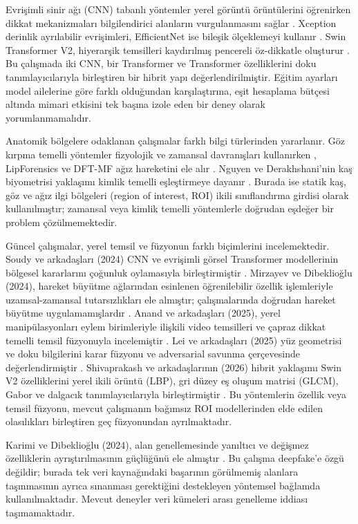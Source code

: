 \documentclass[a4paper]{elektr}
\begin{document}
Evrişimli sinir ağı (CNN) tabanlı yöntemler yerel görüntü örüntülerini öğrenirken dikkat mekanizmaları bilgilendirici alanların vurgulanmasını sağlar \cite{zhao}. Xception derinlik ayrılabilir evrişimleri, EfficientNet ise bileşik ölçeklemeyi kullanır \cite{chollet,tan}. Swin Transformer V2, hiyerarşik temsilleri kaydırılmış pencereli öz-dikkatle oluşturur \cite{swin}. Bu çalışmada iki CNN, bir Transformer ve Transformer özelliklerini doku tanımlayıcılarıyla birleştiren bir hibrit yapı değerlendirilmiştir. Eğitim ayarları model ailelerine göre farklı olduğundan karşılaştırma, eşit hesaplama bütçesi altında mimari etkisini tek başına izole eden bir deney olarak yorumlanmamalıdır.

Anatomik bölgelere odaklanan çalışmalar farklı bilgi türlerinden yararlanır. Göz kırpma temelli yöntemler fizyolojik ve zamansal davranışları kullanırken \cite{li,jung}, LipForensics ve DFT-MF ağız hareketini ele alır \cite{haliassos,elhassan}. Nguyen ve Derakhshani'nin kaş biyometrisi yaklaşımı kimlik temelli eşleştirmeye dayanır \cite{nguyen}. Burada ise statik kaş, göz ve ağız ilgi bölgeleri (region of interest, ROI) ikili sınıflandırma girdisi olarak kullanılmıştır; zamansal veya kimlik temelli yöntemlerle doğrudan eşdeğer bir problem çözülmemektedir.

Güncel çalışmalar, yerel temsil ve füzyonun farklı biçimlerini incelemektedir. Soudy ve arkadaşları (2024) CNN ve evrişimli görsel Transformer modellerinin bölgesel kararlarını çoğunluk oylamasıyla birleştirmiştir \cite{soudy}. Mirzayev ve Dibeklioğlu (2024), hareket büyütme ağlarından esinlenen öğrenilebilir özellik işlemleriyle uzamsal-zamansal tutarsızlıkları ele almıştır; çalışmalarında doğrudan hareket büyütme uygulamamışlardır \cite{mirzayev}. Anand ve arkadaşları (2025), yerel manipülasyonları eylem birimleriyle ilişkili video temsilleri ve çapraz dikkat temelli temsil füzyonuyla incelemiştir \cite{anand}. Lei ve arkadaşları (2025) yüz geometrisi ve doku bilgilerini karar füzyonu ve adversarial savunma çerçevesinde değerlendirmiştir \cite{lei}. Shivaprakash ve arkadaşlarının (2026) hibrit yaklaşımı Swin V2 özelliklerini yerel ikili örüntü (LBP), gri düzey eş oluşum matrisi (GLCM), Gabor ve dalgacık tanımlayıcılarıyla birleştirmiştir \cite{shivaprakash}. Bu yöntemlerin özellik veya temsil füzyonu, mevcut çalışmanın bağımsız ROI modellerinden elde edilen olasılıkları birleştiren geç füzyonundan ayrılmaktadır.

Karimi ve Dibeklioğlu (2024), alan genellemesinde yanıltıcı ve değişmez özelliklerin ayrıştırılmasının güçlüğünü ele almıştır \cite{karimi}. Bu çalışma deepfake'e özgü değildir; burada tek veri kaynağındaki başarının görülmemiş alanlara taşınmasının ayrıca sınanması gerektiğini destekleyen yöntemsel bağlamda kullanılmaktadır. Mevcut deneyler veri kümeleri arası genelleme iddiası taşımamaktadır.
\end{document}
